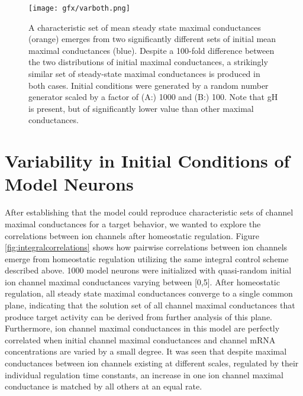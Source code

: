 \begin{figure}[H]
    \centering
    \texttt{[image: gfx/varboth.png]}
\caption[Mean ion channel conductances of \ac{g0} and steady-state maximal conductance values in an integral control model.]{A characteristic set of mean steady state maximal conductances (orange) emerges from two significantly different sets of initial mean maximal conductances (blue).  Despite a 100-fold difference between the two distributions of initial maximal conductances, a strikingly similar set of steady-state maximal conductances is produced in both cases. Initial conditions were generated by a random number generator scaled by a factor of (\textsc{A:}) 1000 and (\textsc{B:}) 100. Note that \ac{gH} is present, but of significantly lower value than other maximal conductances.}\label{fig:var_integral}
\end{figure}

\section{Variability in Initial Conditions of Model Neurons}

After establishing that the model could reproduce characteristic sets of channel maximal conductances for a target behavior, we wanted to explore the correlations between ion channels after homeostatic regulation. Figure \ref{fig:integralcorrelations} shows how pairwise correlations between ion channels emerge from homeostatic regulation utilizing the same integral control scheme described above. 1000 model neurons were initialized with quasi-random initial ion channel maximal conductances varying between [0,5]. After homeostatic regulation, all steady state maximal conductances converge to a single common plane, indicating that the solution set of all channel maximal conductances that produce target activity can be derived from further analysis of this plane.
Furthermore, ion channel maximal conductances in this model are perfectly correlated when initial channel maximal conductances and channel mRNA concentrations are varied by a small degree. It was seen that despite maximal conductances between ion channels existing at different scales, regulated by their individual regulation time constants, an increase in one ion channel maximal conductance is matched by all others at an equal rate.

